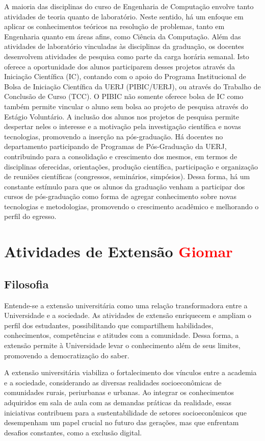 A maioria das disciplinas do curso de Engenharia de Computação envolve tanto atividades de teoria quanto de laboratório. Neste sentido, há um enfoque em aplicar os conhecimentos teóricos na resolução de problemas, tanto em Engenharia quanto em áreas afins, como Ciência da Computação. Além das atividades de laboratório vinculadas às disciplinas da graduação, os docentes desenvolvem atividades de pesquisa como parte da carga horária semanal. Isto oferece a oportunidade dos alunos participarem desses projetos através da Iniciação Científica (IC), contando com o apoio do Programa Institucional de Bolsa de Iniciação Científica da UERJ (PIBIC/UERJ), ou através do Trabalho de Conclusão de Curso (TCC). O PIBIC não somente oferece bolsa de IC como também permite vincular o aluno sem bolsa ao projeto de pesquisa através do Estágio Voluntário. A inclusão dos alunos nos projetos de pesquisa permite despertar neles o interesse e a motivação pela investigação científica e novas tecnologias, promovendo a inserção na pós-graduação. Há docentes no departamento participando de Programas de Pós-Graduação da UERJ, contribuindo para a consolidação e crescimento dos mesmos, em termos de disciplinas oferecidas, orientações, produção científica, participação e organização de reuniões científicas (congressos, seminários, simpósios). Dessa forma, há um constante estímulo para que os alunos da graduação venham a participar dos cursos de pós-graduação como forma de agregar conhecimento sobre novas tecnologias e metodologias, promovendo o crescimento acadêmico e melhorando o perfil do egresso.

\section{Atividades de Extensão \textcolor{red}{Giomar}}

\subsection{Filosofia}
Entende-se a extensão universitária como uma relação transformadora entre a Universidade e a sociedade. As atividades de extensão enriquecem e ampliam o perfil dos estudantes, possibilitando que compartilhem habilidades, conhecimentos, competências e atitudes com a comunidade. Dessa forma, a extensão permite à Universidade levar o conhecimento além de seus limites, promovendo a democratização do saber.

A extensão universitária viabiliza o fortalecimento dos vínculos entre a academia e a sociedade, considerando as diversas realidades socioeconômicas de comunidades rurais, periurbanas e urbanas. Ao integrar os conhecimentos adquiridos em sala de aula com as demandas práticas da realidade, essas iniciativas contribuem para a sustentabilidade de setores socioeconômicos que desempenham um papel crucial no futuro das gerações, mas que enfrentam desafios constantes, como a exclusão digital.

